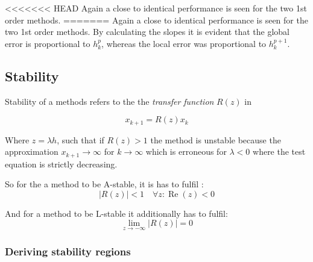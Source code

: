 <<<<<<< HEAD
Again a close to identical performance is seen for the two 1st order methods.
=======
Again a close to identical performance is seen for the two 1st order methods. By calculating the slopes it is evident that the global error is proportional to $h_{k}^{p}$, whereas the local error was proportional to $h_{k}^{p+1}$.

\subsection{Stability}
Stability of a methods refers to the the \textit{transfer function} $R(z)$ in

\begin{equation}
    x_{k+1}=R(z) x_{k}
\end{equation}

Where $z = \lambda h$, such that if $R(z) > 1$ the method is unstable because the approximation $x_{k+1} \to \infty$ for $k \to \infty$ which is erroneous for $\lambda < 0$ where the test equation is strictly decreasing.

So for the a method to be A-stable, it is has to fulfil \cite{JrgensenRunge-KuttaControl}:
\begin{equation}
    |R(z)|<1 \quad \forall z: \operatorname{Re}(z)<0
\end{equation}

And for a method to be L-stable it additionally has to fulfil:
\begin{equation}
\lim _{z \rightarrow-\infty}|R(z)|=0
\end{equation}

\subsubsection*{Deriving stability regions}



